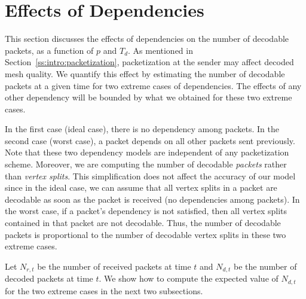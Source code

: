 \section{Effects of Dependencies}
\label{s:model:effect}

    This section discusses the effects of dependencies
    on the number of decodable packets, as a function of
    $p$ and $T_d$.  As mentioned in Section~\ref{ss:intro:packetization},
    packetization at the sender may affect
    decoded mesh quality.  We quantify 
    this effect by estimating the number of
    decodable packets at a given time for two extreme cases
    of dependencies.  The effects of any other dependency
    will be bounded by what we obtained for these two extreme cases.

    In the first case (ideal
    case), there is no dependency among packets.
    In the second case (worst case), a packet depends on all other packets
    sent previously.  Note that these two dependency models are
    independent of any packetization scheme.
    Moreover, we are computing the number of decodable \textit{packets} rather
    than \textit{vertex splits}.  This simplification does not affect
    the accuracy of our model
    since in the ideal case, we can assume that all vertex splits
    in a packet are decodable as soon as the packet is received (no dependencies
    among packets).  In the worst case, if a packet's dependency is not
    satisfied, then all vertex splits contained in that packet are
    not decodable.  Thus, the number of decodable packets is
    proportional to the number of decodable vertex splits in these two extreme
    cases.

    Let $N_{r,t}$ be the number of received packets at time $t$ and
    $N_{d,t}$ be the number of decoded packets at time $t$.   We show
    how to compute the expected value of $N_{d,t}$ for the two
    extreme cases in the next two subsections.

